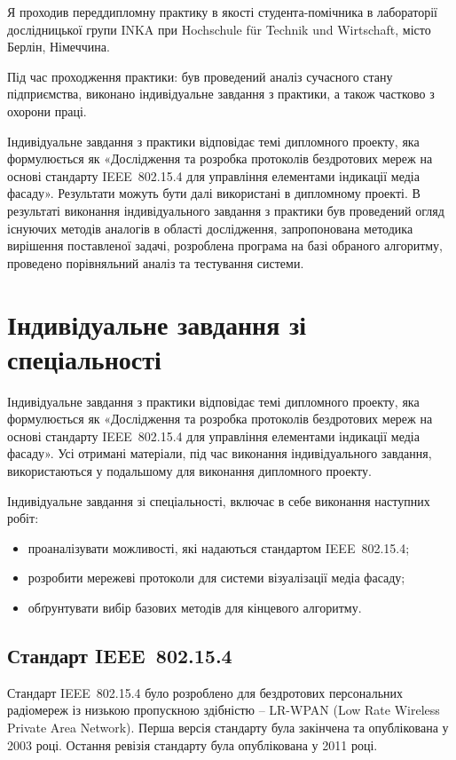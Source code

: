 \documentclass[a4paper,ukrainian,utf8,nocolumnsxix,floatsection]{eskdtext}
\let\stdsection\section
\renewcommand\section{\clearpage\stdsection}
\newcommand{\iee}[0]{IEEE~802.15.4\xspace}
\begin{document}
Я проходив переддипломну практику в якості студента-помічника в лабораторії дослідницької групи INKA при Hochschule für Technik und Wirtschaft, місто Берлін, Німеччина.

Під час проходження практики: був проведений аналіз сучасного стану підприємства, виконано індивідуальне завдання з практики, а також частково з  охорони праці. 

Індивідуальне завдання з практики відповідає темі дипломного проекту, яка  формулюється як «Дослідження та розробка протоколів бездротових мереж на основі стандарту \iee для управління елементами індикації медіа фасаду». Результати можуть бути далі використані в дипломному проекті. В результаті виконання індивідуального завдання з практики був проведений огляд існуючих методів аналогів в області дослідження, запропонована методика вирішення поставленої задачі, розроблена програма на базі обраного алгоритму, проведено порівняльний аналіз та тестування системи.

\section{Індивідуальне завдання зі спеціальності}

Індивідуальне завдання з практики відповідає темі дипломного проекту, яка  формулюється як «Дослідження та розробка протоколів бездротових мереж на основі стандарту \iee для управління елементами індикації медіа фасаду». Усі отримані матеріали, під час виконання індивідуального завдання, використаються у подальшому для виконання дипломного проекту.

Індивідуальне завдання зі спеціальності, включає в себе виконання наступних робіт:
\begin{itemize}
	\item проаналізувати можливості, які надаються стандартом \iee;
	\item розробити мережеві протоколи для системи візуалізації медіа фасаду;
	\item обґрунтувати вибір базових методів для кінцевого алгоритму.
\end{itemize}

\subsection{Стандарт \iee}
\label{sub:ieee:standard}

Стандарт \iee було розроблено для бездротових персональних радіомереж із низькою пропускною здібністю – LR-WPAN (Low Rate Wireless Private Area Network). Перша версія стандарту була закінчена та опублікована у 2003 році. Остання ревізія стандарту була опублікована у 2011 році. 
\end{document}
